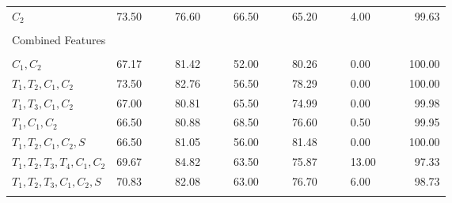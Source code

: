 \begin{table}
{\begin{center}
\begin{tabularx}{0.95\textwidth}{@{}l	lllr	 ll	lllr	 ll lllr @{}}
 $C_2$ & \cellcolor[gray]{0.8}73.50 &\cellcolor[gray]{0.8} &\cellcolor[gray]{0.8} & \cellcolor[gray]{0.8}76.60 & & & 66.50 & & & 65.20 & & & 4.00 & & & 99.63\\
	\multicolumn{17}{l}{}\\
	Combined Features\\
	\multicolumn{17}{l}{}\\[-2ex]
$C_1,C_2	$					& \cellcolor[gray]{0.8}67.17 &\cellcolor[gray]{0.8} &\cellcolor[gray]{0.8} & \cellcolor[gray]{0.8}81.42 & & & 52.00 & & & 80.26 & & & 0.00 & & & 100.00 \\
$T_1,T_2,C_1,C_2$			& \cellcolor[gray]{0.8}73.50	&\cellcolor[gray]{0.8} &\cellcolor[gray]{0.8} & \cellcolor[gray]{0.8}82.76 & & & 56.50 & & & 78.29 & & & 0.00 & & & 100.00\\
$T_1,T_3,C_1,C_2$			& \cellcolor[gray]{0.8}67.00	&\cellcolor[gray]{0.8} &\cellcolor[gray]{0.8} & \cellcolor[gray]{0.8}80.81 & & & 65.50 & & & 74.99 & & & 0.00 & & & 99.98\\
$T_1,C_1,C_2$				& \cellcolor[gray]{0.8}66.50	&\cellcolor[gray]{0.8} &\cellcolor[gray]{0.8} & \cellcolor[gray]{0.8}80.88 & & & 68.50 & & & 76.60 & & & 0.50 & & & 99.95\\
$T_1,T_2,C_1,C_2,S$			& \cellcolor[gray]{0.8}66.50	&\cellcolor[gray]{0.8} &\cellcolor[gray]{0.8} & \cellcolor[gray]{0.8}81.05 & & & 56.00 & & & 81.48 & & & 0.00 & & & 100.00\\
$T_1,T_2,T_3,T_4,C_1,C_2$	& \cellcolor[gray]{0.8}69.67	&\cellcolor[gray]{0.8} &\cellcolor[gray]{0.8} & \cellcolor[gray]{0.8}84.82 & & & 63.50 & & & 75.87 & & & 13.00 & & & 97.33\\
$T_1,T_2,T_3,C_1,C_2,S$		& \cellcolor[gray]{0.8}70.83	&\cellcolor[gray]{0.8} &\cellcolor[gray]{0.8} & \cellcolor[gray]{0.8}82.08 & & & 63.00 & & & 76.70 & & & 6.00 & & & 98.73\\
 	\multicolumn{17}{l}{}\\
 	\bottomrule
  \end{tabularx}  
	
	
	
	
\end{center}
 }
\end{table}
	



	




	


























	
















